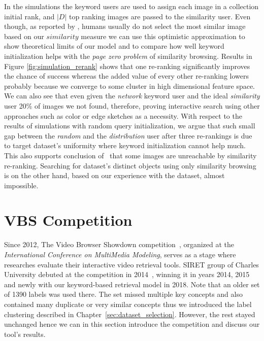 In the simulations the keyword users are used to assign each image in a collection initial rank, and $|D|$ top ranking images are passed to the similarity user. Even though, as reported by \cite{kovalvcik2017comparison}, humans usually do not select the most similar image based on our $similarity$ measure we can use this optimistic approximation to show theoretical limits of our model and to compare how well keyword initialization helps with the \textit{page zero problem} of similarity browsing.
Results in Figure \ref{fig:simulation_rerank} shows that one re-ranking significantly improves the chance of success whereas the added value of every other re-ranking lowers probably because we converge to some cluster in high dimensional feature space. We can also see that even given the \textit{network} keyword user and the ideal \textit{similarity} user 20\% of images we not found, therefore, proving interactive search using other approaches such as color or edge sketches as a necessity. With respect to the results of simulations with random query initialization, we argue that such small gap between the \textit{random} and the \textit{distribution} user after three re-rankings is due to target dataset's uniformity where keyword initialization cannot help much. This also supports conclusion of~\cite{kovalvcik2017comparison} that some images are unreachable by similarity re-ranking. Searching for dataset's distinct objects using only similarity browsing is on the other hand, based on our experience with the dataset, almost impossible.



\section{VBS Competition}

Since 2012, The Video Browser Showdown competition~\cite{cobarzan2017interactive,Lokoc-influential-trends}, organized at the \textit{International Conference on MultiMedia Modeling}, serves as a stage where researches evaluate their interactive video retrieval tools. SIRET group of Charles University debuted at the competition in 2014~\cite{Lokoc-VBS2014}, winning it in years 2014, 2015 and newly with our keyword-based retrieval model in 2018. Note that an older set of 1390 labels was used there. The set missed multiple key concepts and also contained many duplicate or very similar concepts thus we introduced the label clustering described in Chapter~\ref{sec:dataset_selection}. However, the rest stayed unchanged hence we can in this section introduce the competition and discuss our tool's results.

